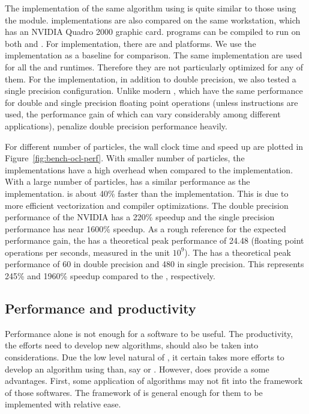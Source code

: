The implementation of the same algorithm using \opencl is quite similar to
those using the \smp module. \opencl implementations are also compared on the
same workstation, which has an NVIDIA Quadro 2000 graphic card. \opencl
programs can be compiled to run on both \cpu and \gpu. For \cpu
implementation, there are \iocl \cite{iocl} and \aocl \cite{aocl} platforms.
We use the \tbb implementation as a baseline for comparison. The same \opencl
implementation are used for all the \cpu and \gpu runtimes. Therefore they are
not particularly optimized for any of them. For the \gpu implementation, in
addition to double precision, we also tested a single precision configuration.
Unlike modern \cpu, which have the same performance for double and single
precision floating point operations (unless \simd instructions are used, the
performance gain of which can vary considerably among different applications),
\gpu penalize double precision performance heavily.

For different number of particles, the wall clock time and speed up are
plotted in Figure~\ref{fig:bench-ocl-perf}. With smaller number of particles,
the \opencl implementations have a high overhead when compared to the \tbb
implementation. With a large number of particles, \aocl has a similar
performance as the \tbb implementation. \iocl is about 40\% faster than the
\tbb implementation. This is due to more efficient vectorization and compiler
optimizations. The double precision performance of the NVIDIA \gpu has a
220\% speedup and the single precision performance has near 1600\% speedup.
As a rough reference for the expected performance gain, the \cpu has a
theoretical peak performance of 24.48 \gflops (floating point operations per
seconds, measured in the unit $10^9$). The \gpu has a theoretical peak
performance of 60 \gflops in double precision and 480 \gflops in single
precision. This represents 245\% and 1960\% speedup compared to the \cpu,
respectively.

\afterpage{\clearpage}

\subsection{Performance and productivity}
\label{sub:Performance and productivity}

Performance alone is not enough for a software to be useful. The productivity,
the efforts need to develop new algorithms, should also be taken into
considerations. Due the low level natural of \cpp, it certain takes more
efforts to develop an algorithm using \vsmc than, say \libbi or \biips.
However, \smc does provide a some advantages. First, some application of \smc
algorithms may not fit into the framework of those softwares. The framework of
\smc is general enough for them to be implemented with relative ease.

